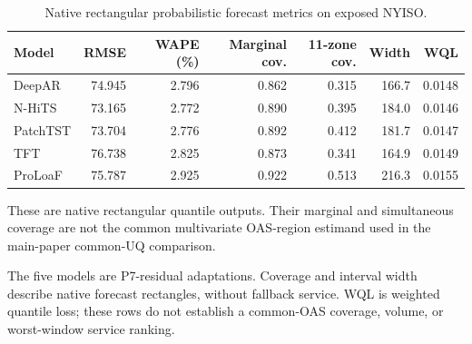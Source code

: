 
\begin{table}[!tbp]
\centering
\caption{Native rectangular probabilistic forecast metrics on exposed NYISO.}
\label{tab:native}
\scriptsize
\setlength{\tabcolsep}{3pt}
\begin{tabular}{lrrrrrr}
\toprule
Model & RMSE & WAPE (\%) & Marginal cov. & 11-zone cov. & Width & WQL \\
\midrule
DeepAR & 74.945 & 2.796 & 0.862 & 0.315 & 166.7 & 0.0148 \\
N-HiTS & 73.165 & 2.772 & 0.890 & 0.395 & 184.0 & 0.0146 \\
PatchTST & 73.704 & 2.776 & 0.892 & 0.412 & 181.7 & 0.0147 \\
TFT & 76.738 & 2.825 & 0.873 & 0.341 & 164.9 & 0.0149 \\
ProLoaF & 75.787 & 2.925 & 0.922 & 0.513 & 216.3 & 0.0155 \\
\bottomrule
\end{tabular}
\par\footnotesize These are native rectangular quantile outputs. Their marginal and simultaneous coverage are not the common multivariate OAS-region estimand used in the main-paper common-UQ comparison.
\par\footnotesize The five models are P7-residual adaptations. Coverage and interval
width describe native forecast rectangles, without fallback service.
WQL is weighted quantile loss; these rows do not establish a common-OAS
coverage, volume, or worst-window service ranking.
\end{table}
